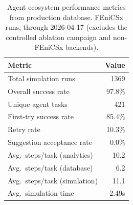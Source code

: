 \begin{table}[htbp]
\centering
\caption{Agent ecosystem performance metrics from production database.  FEniCSx runs, through 2026-04-17 (excludes the controlled ablation campaign and non-FEniCSx backends).}
\label{tab:agent-metrics}
\begin{tabular}{lr}
\toprule
Metric & Value \\
\midrule
Total simulation runs & 1369 \\
Overall success rate & 97.8\% \\
Unique agent tasks & 421 \\
First-try success rate & 85.4\% \\
Retry rate & 10.3\% \\
Suggestion acceptance rate & 0.0\% \\
Avg.\ steps/task (analytics) & 10.2 \\
Avg.\ steps/task (database) & 6.2 \\
Avg.\ steps/task (simulation) & 11.1 \\
Avg.\ simulation time & 2.49s \\
\bottomrule
\end{tabular}
\end{table}